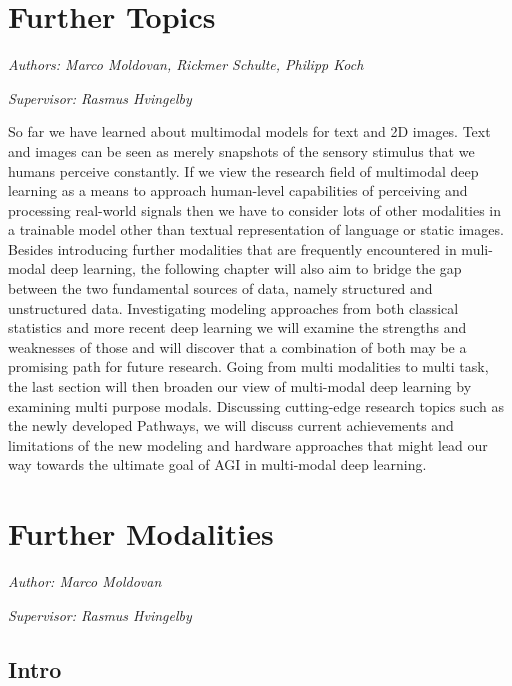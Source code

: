 \documentclass[
]{krantz}
\begin{document}
\hypertarget{further-topics}{%
\chapter{Further Topics}\label{further-topics}}

\emph{Authors: Marco Moldovan, Rickmer Schulte, Philipp Koch}

\emph{Supervisor: Rasmus Hvingelby}

So far we have learned about multimodal models for text and 2D images. Text and images can be seen as merely snapshots of the sensory stimulus that we humans perceive constantly. If we view the research field of multimodal deep learning as a means to approach human-level capabilities of perceiving and processing real-world signals then we have to consider lots of other modalities in a trainable model other than textual representation of language or static images. Besides introducing further modalities that are frequently encountered in muli-modal deep learning, the following chapter will also aim to bridge the gap between the two fundamental sources of data, namely structured and unstructured data. Investigating modeling approaches from both classical statistics and more recent deep learning we will examine the strengths and weaknesses of those and will discover that a combination of both may be a promising path for future research. Going from multi modalities to multi task, the last section will then broaden our view of multi-modal deep learning by examining multi purpose modals. Discussing cutting-edge research topics such as the newly developed Pathways, we will discuss current achievements and limitations of the new modeling and hardware approaches that might lead our way towards the ultimate goal of AGI in multi-modal deep learning.

\hypertarget{further-modalities}{%
\chapter{Further Modalities}\label{further-modalities}}

\emph{Author: Marco Moldovan}

\emph{Supervisor: Rasmus Hvingelby}

\hypertarget{intro}{%
\section{Intro}\label{intro}}
\end{document}

